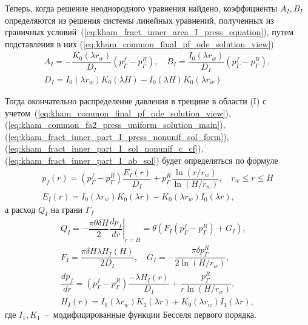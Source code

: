\documentclass{article}
\begin{document}
Теперь, когда решение неоднородного уравнения найдено, коэффициенты $A_{I}, B_I$ определяются из решения системы
линейных уравнений, полученных из граничных условий~(\ref{eq:kham_fract_inner_area_I_press_equation}), путем подставления
в них (\ref{eq:kham_common_final_pf_ode_solution_view})
\begin{equation}
	\displaystyle
	\begin{gathered}
		A_I = - \dfrac{K_0 \left(\lambda r_w\right)}{D_I} \left(p^f_{\Gamma} - p^R_{\Gamma}\right), \quad
		B_I = \dfrac{I_0 \left(\lambda r_w\right)}{D_I} \left(p^f_{\Gamma} - p^R_{\Gamma}\right), \\[6pt]
		D_I = I_0 \left(\lambda r_w \right)K_0\left(\lambda H\right) - I_0\left(\lambda H\right) K_0\left(\lambda r_w\right)
	\end{gathered}
	\label{eq:kham_fract_inner_part_I_ab_sol}
\end{equation}

Тогда окончательно распределение давления в трещине в области (I) с учетом~(\ref{eq:kham_common_final_pf_ode_solution_view}),
(\ref{eq:kham_common_fa2_press_uniform_solution_main}), (\ref{eq:kham_fract_inner_part_I_press_nonunif_sol_form}),
(\ref{eq:kham_fract_inner_part_I_sol_nonunif_c_cf}),
(\ref{eq:kham_fract_inner_part_I_ab_sol}) будет определяться по формуле
\begin{equation}
	\displaystyle
	\begin{gathered}
		p_f\left(r\right) = \left(p^f_{\Gamma} - p^R_{\Gamma}\right)
		\dfrac{E_I\left(r\right)}{D_I}
		+ p^R_{\Gamma} \dfrac{\ln\left(r/r_w\right)}{\ln{\left(H/r_w\right)}}, \quad
		r_w \leq r \leq H \\[6pt]
		E_I\left(r\right) = I_0\left(\lambda r_w\right)K_0\left(\lambda r\right) - K_0\left(\lambda r_w\right)I_0\left(\lambda r\right),
	\end{gathered}
	\label{eq:kham_final_sol_pf_radial}
\end{equation}
а расход $Q_I$ на грани $\Gamma_f$
\begin{equation}
	\displaystyle
	\begin{gathered}
		Q_I = - \dfrac{\pi \theta \delta H}{2} \left. \dfrac{d p_f}{d r}\right|_{r=H} =
		\theta \left(    F_I \left(p^f_{\Gamma} - p^R_{\Gamma}\right) + G_I \right) , \\[8pt]
		F_I = \dfrac{\pi \delta H \lambda H_I\left(H\right)}{2 D_I}, \quad
		G_I = -\dfrac{\pi \delta p^R_{\Gamma}}{2 \ln{\left(H/r_w\right)}},  \\[8pt]
		\dfrac{d p_f}{d r} = \left(p^f_{\Gamma} - p^R_{\Gamma}\right)
		\dfrac{-\lambda H_I\left(r\right)}{D_I} +
		\dfrac{p^R_{\Gamma}}{r \ln{\left(H/r_w\right)}}, \\[8pt]
		H_I\left(r\right) =
		I_0\left(\lambda r_w\right)K_1\left(\lambda r\right) +
		K_0\left(\lambda r_w\right)I_1\left(\lambda r\right),
	\end{gathered}
	\label{eq:kham_hw_inner_part_I_Q}
\end{equation}
где $I_1, K_1$~--~модифицированные функции Бесселя первого порядка.
\end{document}
